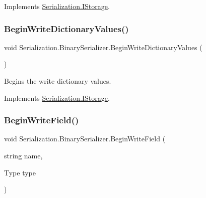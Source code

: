 Implements \hyperlink{interface_serialization_1_1_i_storage_a553edaa5a225986c161626c9ede9e594}{Serialization.\+I\+Storage}.

\mbox{\label{class_serialization_1_1_binary_serializer_af0bf198e95f7bac8d27a41d4dbf9a7ce}} 
\subsubsection{\texorpdfstring{Begin\+Write\+Dictionary\+Values()}{BeginWriteDictionaryValues()}}
{\footnotesize\ttfamily void Serialization.\+Binary\+Serializer.\+Begin\+Write\+Dictionary\+Values (\begin{DoxyParamCaption}{ }\end{DoxyParamCaption})\hspace{0.3cm}{\ttfamily [inline]}}



Begins the write dictionary values. 



Implements \hyperlink{interface_serialization_1_1_i_storage_af44f1eb41f0ac51acf315388150bd6bf}{Serialization.\+I\+Storage}.

\mbox{\label{class_serialization_1_1_binary_serializer_a33ed72f54b3502aa05c62bf777027fde}} 
\subsubsection{\texorpdfstring{Begin\+Write\+Field()}{BeginWriteField()}}
{\footnotesize\ttfamily void Serialization.\+Binary\+Serializer.\+Begin\+Write\+Field (\begin{DoxyParamCaption}\item[{string}]{name,  }\item[{Type}]{type }\end{DoxyParamCaption})\hspace{0.3cm}{\ttfamily [inline]}}



